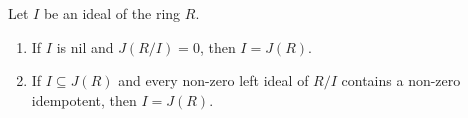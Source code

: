 Let $I$ be an ideal of the ring $R$.
\begin{enumerate}
\item[(1)] If $I$ is nil and $J(R/I) = 0$, then $I = J(R)$.
\item[(2)] If $I \subseteq J(R)$ and every non-zero left ideal of $R/I$ contains a non-zero idempotent, then $I = J(R)$.
\end{enumerate}

